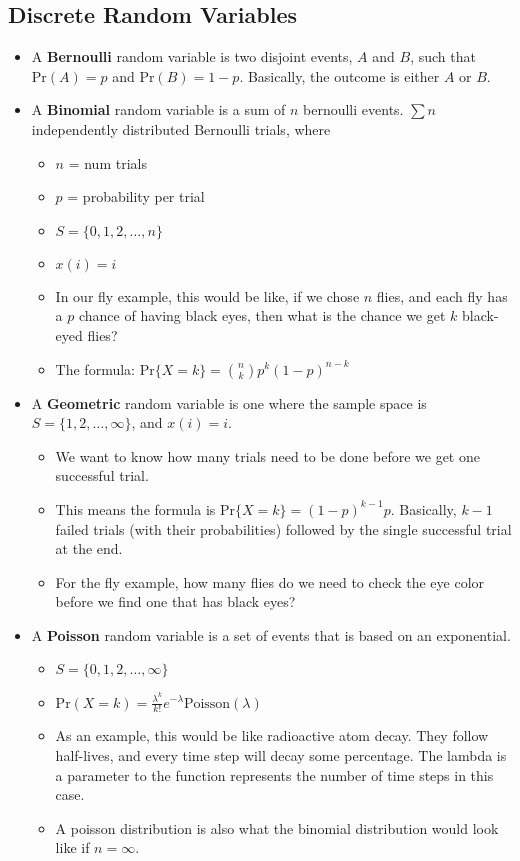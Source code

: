 \documentclass[10pt]{article}
\newcommand{\pr}{\text{Pr}}
\begin{document}
\subsection*{Discrete Random Variables}
\begin{itemize}
    \item A \textbf{Bernoulli} random variable is two disjoint events, $A$ and $B$, such that $\pr(A) = p$ and $\pr(B) = 1 - p$.  Basically, the outcome is either $A$ or $B$.
    \item A \textbf{Binomial} random variable is a sum of $n$ bernoulli events.  $\sum n$ independently distributed Bernoulli trials, where 
    \begin{itemize}
        \item $n$ = num trials
        \item $p$ = probability per trial
        \item $S = \{0, 1, 2, \dots, n\}$
        \item $x(i) = i$
        \item In our fly example, this would be like, if we chose $n$ flies, and each fly has a $p$ chance of having black eyes, then what is the chance we get $k$ black-eyed flies? 
        \item The formula: $\pr \{X = k\} = {n \choose k} p^k (1 - p)^{n - k}$
    \end{itemize}
    \item A \textbf{Geometric} random variable is one where the sample space is $S = \{1, 2, \dots, \infty\}$, and $x(i) = i$. 
    \begin{itemize}
	    \item We want to know how many trials need to be done before we get one successful trial.  
	    \item This means the formula is $\pr\{X = k\} = (1 - p)^{k - 1}p$.  Basically, $k - 1$ failed trials (with their probabilities) followed by the single successful trial at the end.
	    \item For the fly example, how many flies do we need to check the eye color before we find one that has black eyes?
    \end{itemize}
    \item A \textbf{Poisson} random variable is a set of events that is based on an exponential.
    \begin{itemize}
        \item $S = \{0, 1, 2, \dots, \infty\}$
        \item $\pr(X = k) = \frac{\lambda^k}{k!}e^{-\lambda} \text{Poisson}(\lambda)$
        \item As an example, this would be like radioactive atom decay.  They follow half-lives, and every time step will decay some percentage.  The lambda is a parameter to the function represents the number of time steps in this case.
        \item A poisson distribution is also what the binomial distribution would look like if $n = \infty$.
    \end{itemize}
\end{itemize}
\end{document}
